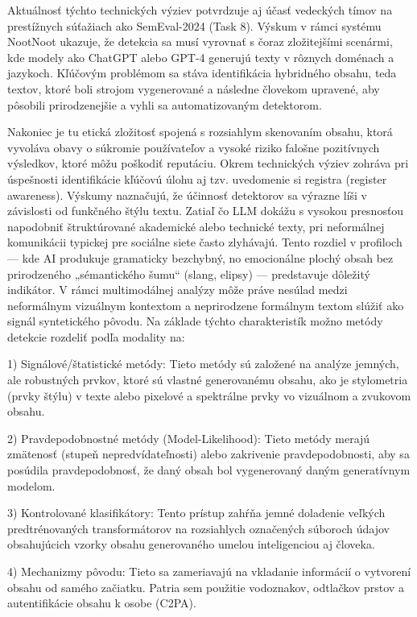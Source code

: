 \documentclass[]{tukediphc}
\begin{document}
Aktuálnosť týchto technických výziev potvrdzuje aj účasť vedeckých tímov na prestížnych súťažiach ako SemEval-2024 (Task 8). Výskum v rámci systému NootNoot ukazuje, že detekcia sa musí vyrovnať s čoraz zložitejšími scenármi, kde modely ako ChatGPT alebo GPT-4 generujú texty v rôznych doménach a jazykoch. Kľúčovým problémom sa stáva identifikácia hybridného obsahu, teda textov, ktoré boli strojom vygenerované a následne človekom upravené, aby pôsobili prirodzenejšie a vyhli sa automatizovaným detektorom\cite{Fine-tuning_Language_Models_for_AI_vs_Human_Generated_Text_detection}.

Nakoniec je tu etická zložitosť spojená s rozsiahlym skenovaním obsahu, ktorá vyvoláva obavy o súkromie používateľov a vysoké riziko falošne pozitívnych výsledkov, ktoré môžu poškodiť reputáciu. Okrem technických výziev zohráva pri úspešnosti identifikácie kľúčovú úlohu aj tzv. uvedomenie si registra (register awareness). Výskumy naznačujú, že účinnosť detektorov sa výrazne líši v závislosti od funkčného štýlu textu. Zatiaľ čo LLM dokážu s vysokou presnosťou napodobniť štruktúrované akademické alebo technické texty, pri neformálnej komunikácii typickej pre sociálne siete často zlyhávajú. Tento rozdiel v profiloch — kde AI produkuje gramaticky bezchybný, no emocionálne plochý obsah bez prirodzeného „sémantického šumu“ (slang, elipsy) — predstavuje dôležitý indikátor\cite{Berber_Sardinha_2024}. V rámci multimodálnej analýzy môže práve nesúlad medzi neformálnym vizuálnym kontextom a neprirodzene formálnym textom slúžiť ako signál syntetického pôvodu. Na základe týchto charakteristík možno metódy detekcie rozdeliť podľa modality na: 

1) Signálové/štatistické metódy: Tieto metódy sú založené na analýze jemných, ale robustných prvkov, ktoré sú vlastné generovanému obsahu, ako je stylometria (prvky štýlu) v texte alebo pixelové a spektrálne prvky vo vizuálnom a zvukovom obsahu\cite{arxiv:2504.02898}.

2) Pravdepodobnostné metódy (Model-Likelihood): Tieto metódy merajú zmätenosť (stupeň nepredvídateľnosti) alebo zakrivenie pravdepodobnosti, aby sa posúdila pravdepodobnosť, že daný obsah bol vygenerovaný daným generatívnym modelom. 

3) Kontrolované klasifikátory: Tento prístup zahŕňa jemné doladenie veľkých predtrénovaných transformátorov na rozsiahlych označených súboroch údajov obsahujúcich vzorky obsahu generovaného umelou inteligenciou aj človeka. 

4) Mechanizmy pôvodu: Tieto sa zameriavajú na vkladanie informácií o vytvorení obsahu od samého začiatku. Patria sem použitie vodoznakov, odtlačkov prstov a autentifikácie obsahu k osobe (C2PA)\cite{arxiv:2504.02898}. 
\end{document}
